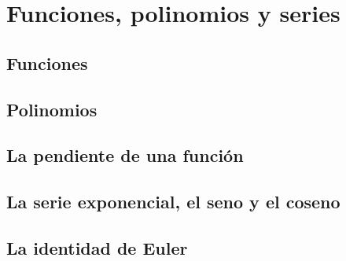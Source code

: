 \chapter{Funciones, polinomios y series}

\section{Funciones}

\section{Polinomios}

\section{La pendiente de una función}

\section{La serie exponencial, el seno y el coseno}

\section{La identidad de Euler}
